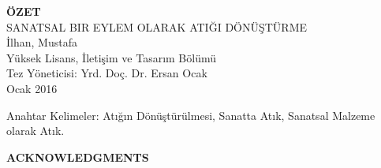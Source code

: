 \documentclass[12pt]{report}
\begin{document}
\thispagestyle{plain}
{}
\doublespacing
\begin{center}
	\vspace*{13.5mm} %
	{\fontsize{14pt}{14pt}\selectfont \textbf{\MakeUppercase{Özet}}}\\
    \vspace{\baselineskip}
    \MakeUppercase{Sanatsal Bir Eylem Olarak Atığı Dönüştürme}\\
    İlhan, Mustafa\\
    Yüksek Lisans, İletişim ve Tasarım Bölümü\\
    Tez Yöneticisi: Yrd. Doç. Dr. Ersan Ocak\\
    \vspace{\baselineskip}
    Ocak 2016
\end{center}

\par \lipsum[2-2]

\noindent Anahtar Kelimeler: Atığın Dönüştürülmesi, Sanatta Atık, Sanatsal Malzeme olarak Atık.
\clearpage


\thispagestyle{plain}
{}
\doublespacing
\begin{center}
	\vspace*{13mm} %
	{\fontsize{14pt}{14pt}\selectfont \textbf{\MakeUppercase{ACKNOWLEDGMENTS}}}\\
    \vspace{3\baselineskip}
\end{center}

\par \lipsum[1-5]

\clearpage


{}

\setcounter{secnumdepth}{3}
\setcounter{tocdepth}{3}

\renewcommand{\cftchapleader}{\cftdotfill{\cftdotsep}} %
\renewcommand{\cfttoctitlefont}{\MakeUppercase\hfil\bfseries\fontsize{14pt}{14pt}\selectfont}
\renewcommand\cftchapfont{\mdseries}
\renewcommand\cftchappagefont{\mdseries}
\renewcommand{\cftchappresnum}{CHAPTER\space}
\renewcommand{\cftchapaftersnum}{:}
\end{document}
